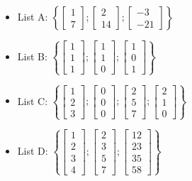 \begin{itemize}
\item
List A: $\left\{ \left[ \begin{array}{c} 1 \\ 7 \end{array} \right] ; 
\left[ \begin{array}{c} 2 \\ 14  \end{array} \right] ; 
\left[ \begin{array}{c} -3 \\ -21  \end{array} \right] \right\} $

\item
List B: $\left\{  \left[ \begin{array}{c} 1 \\ 1 \\ 1 \end{array} \right] ; 
\left[ \begin{array}{c} 1 \\ 1 \\ 0 \end{array} \right] ;
\left[ \begin{array}{c} 1 \\ 0 \\ 1 \end{array} \right]  \right\}
$

\item
List C: $\left\{  \left[ \begin{array}{c} 1 \\ 2 \\ 3 \end{array} \right] ; 
\left[ \begin{array}{c} 0 \\ 0 \\ 0 \end{array} \right] ;
\left[ \begin{array}{c} 2 \\ 5 \\ 7 \end{array} \right] ;
\left[ \begin{array}{c} 2 \\ 1 \\ 0 \end{array} \right] \right\} $

\item
List D: $\left\{ \left[ \begin{array}{c} 1 \\ 2 \\ 3 \\ 4\end{array} \right] ; 
\left[ \begin{array}{c} 2 \\ 3 \\ 5 \\ 7\end{array} \right] ; 
\left[ \begin{array}{c} 12 \\ 23 \\ 35 \\ 58\end{array} \right] \right\} $



\end{itemize}
